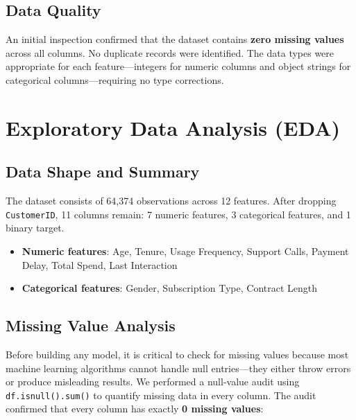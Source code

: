 \documentclass[12pt, a4paper]{article}
\begin{document}
\subsection{Data Quality}

An initial inspection confirmed that the dataset contains \textbf{zero missing values} across all columns. No duplicate records were identified. The data types were appropriate for each feature---integers for numeric columns and object strings for categorical columns---requiring no type corrections.

\section{Exploratory Data Analysis (EDA)}

\subsection{Data Shape and Summary}

The dataset consists of 64,374 observations across 12 features. After dropping \texttt{CustomerID}, 11 columns remain: 7 numeric features, 3 categorical features, and 1 binary target.

\begin{itemize}
    \item \textbf{Numeric features}: Age, Tenure, Usage Frequency, Support Calls, Payment Delay, Total Spend, Last Interaction
    \item \textbf{Categorical features}: Gender, Subscription Type, Contract Length
\end{itemize}

\subsection{Missing Value Analysis}

Before building any model, it is critical to check for missing values because most machine learning algorithms cannot handle null entries---they either throw errors or produce misleading results. We performed a null-value audit using \texttt{df.isnull().sum()} to quantify missing data in every column. The audit confirmed that every column has exactly \textbf{0 missing values}:
\end{document}
